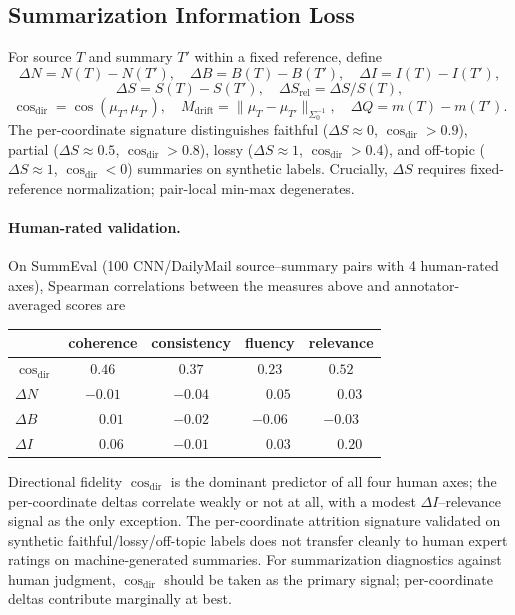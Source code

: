 \documentclass[11pt]{article}
\begin{document}
\subsection{Summarization Information Loss}\label{sec:summarization}

For source $T$ and summary $T'$ within a fixed reference, define
\[
\Delta N = N(T) - N(T'), \quad
\Delta B = B(T) - B(T'), \quad
\Delta I = I(T) - I(T'),
\]
\[
\Delta S = S(T) - S(T'), \quad
\Delta S_{\mathrm{rel}} = \Delta S / S(T),
\]
\[
\cos_{\mathrm{dir}} = \cos(\mu_T, \mu_{T'}), \quad
M_{\mathrm{drift}} = \|\mu_T - \mu_{T'}\|_{\Sigma_0^{-1}}, \quad
\Delta Q = m(T) - m(T').
\]
The per-coordinate signature distinguishes faithful ($\Delta S \approx 0$, $\cos_{\mathrm{dir}} > 0.9$), partial ($\Delta S \approx 0.5$, $\cos_{\mathrm{dir}} > 0.8$), lossy ($\Delta S \approx 1$, $\cos_{\mathrm{dir}} > 0.4$), and off-topic ($\Delta S \approx 1$, $\cos_{\mathrm{dir}} < 0$) summaries on synthetic labels. Crucially, $\Delta S$ requires fixed-reference normalization; pair-local min-max degenerates.

\paragraph{Human-rated validation.} On SummEval (100 CNN/DailyMail source--summary pairs with 4 human-rated axes), Spearman correlations between the measures above and annotator-averaged scores are
\begin{center}
\begin{tabular}{lcccc}
\toprule
& coherence & consistency & fluency & relevance \\
\midrule
$\cos_{\mathrm{dir}}$ & $0.46$ & $0.37$ & $0.23$ & $0.52$ \\
$\Delta N$            & $-0.01$ & $-0.04$ & $\phantom{-}0.05$ & $\phantom{-}0.03$ \\
$\Delta B$            & $\phantom{-}0.01$ & $-0.02$ & $-0.06$ & $-0.03$ \\
$\Delta I$            & $\phantom{-}0.06$ & $-0.01$ & $\phantom{-}0.03$ & $\phantom{-}0.20$ \\
\bottomrule
\end{tabular}
\end{center}
Directional fidelity $\cos_{\mathrm{dir}}$ is the dominant predictor of all four human axes; the per-coordinate deltas correlate weakly or not at all, with a modest $\Delta I$--relevance signal as the only exception. The per-coordinate attrition signature validated on synthetic faithful/lossy/off-topic labels does not transfer cleanly to human expert ratings on machine-generated summaries. For summarization diagnostics against human judgment, $\cos_{\mathrm{dir}}$ should be taken as the primary signal; per-coordinate deltas contribute marginally at best.
\end{document}
